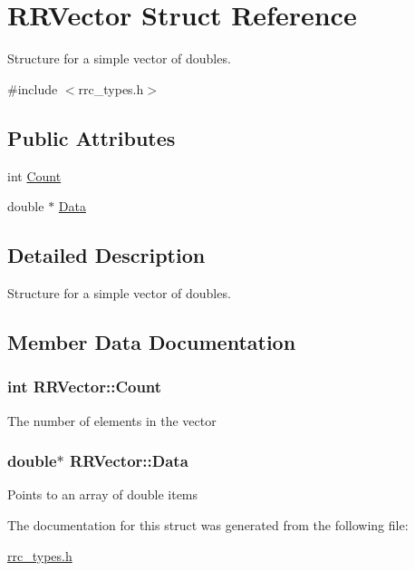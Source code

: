 \hypertarget{struct_r_r_vector}{}\section{R\+R\+Vector Struct Reference}
\label{struct_r_r_vector}


Structure for a simple vector of doubles.  




{\ttfamily \#include $<$rrc\+\_\+types.\+h$>$}

\subsection*{Public Attributes}
\begin{DoxyCompactItemize}
\item 
int \hyperlink{struct_r_r_vector_ac3284c62697a2b68a7900a668a09d858}{Count}
\item 
double $\ast$ \hyperlink{struct_r_r_vector_a9c6dbe52307dad739b6e64c7e4770108}{Data}
\end{DoxyCompactItemize}


\subsection{Detailed Description}
Structure for a simple vector of doubles. 

\subsection{Member Data Documentation}
\hypertarget{struct_r_r_vector_ac3284c62697a2b68a7900a668a09d858}{}
\subsubsection[{Count}]{\setlength{\rightskip}{0pt plus 5cm}int R\+R\+Vector\+::\+Count}\label{struct_r_r_vector_ac3284c62697a2b68a7900a668a09d858}
The number of elements in the vector \hypertarget{struct_r_r_vector_a9c6dbe52307dad739b6e64c7e4770108}{}
\subsubsection[{Data}]{\setlength{\rightskip}{0pt plus 5cm}double$\ast$ R\+R\+Vector\+::\+Data}\label{struct_r_r_vector_a9c6dbe52307dad739b6e64c7e4770108}
Points to an array of double items 

The documentation for this struct was generated from the following file\+:\begin{DoxyCompactItemize}
\item 
\hyperlink{rrc__types_8h}{rrc\+\_\+types.\+h}\end{DoxyCompactItemize}
